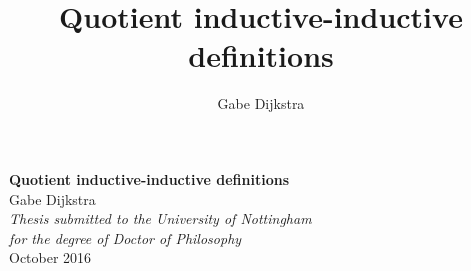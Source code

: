 

\title{Quotient inductive-inductive definitions}
\author{Gabe Dijkstra}



\frontmatter

\begin{titlepage}

\begin{center}

{\huge \bfseries Quotient inductive-inductive definitions}\\[6cm]

 \large {Gabe Dijkstra}
\\[3cm]

 
\large \textit{Thesis submitted to the University of Nottingham\\  for the degree of Doctor of Philosophy}\\[4cm] %


 
{\large October 2016}\\[4cm]
 
\vfill
\end{center}

\end{titlepage}




\tableofcontents

\mainmatter










\appendix




\backmatter

\printbibliography


